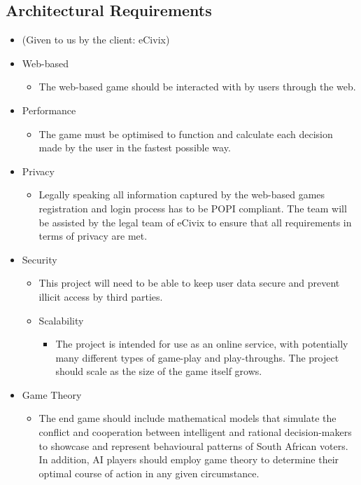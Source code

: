 \documentclass{article}
\begin{document}
   \subsection{Architectural Requirements}
   \begin{itemize}
   \item (Given to us by the client: eCivix)
        \item Web-based
		\begin{itemize}
			\item The web-based game should be interacted with by users through the web.
	    \end{itemize}
	    
	    \item Performance
		\begin{itemize}
			\item The game must be optimised to function and calculate each decision made by the user in the fastest possible way.
	    \end{itemize}
	    
	    \item Privacy 
		\begin{itemize}
			\item Legally speaking all information captured by the web-based games registration and login process has to be POPI compliant. The team will be assisted by the legal team of eCivix to ensure that all requirements in terms of privacy are met. 
	    \end{itemize}
	    
	    \item Security
		\begin{itemize}
			\item This project will need to be able to keep user data secure and prevent illicit access by third parties. 
            
		\item Scalability 
            		\begin{itemize}
				\item The project is intended for use as an online service, with potentially many different types of game-play and play-throughs. The project should scale as the size of the game itself grows. 
			\end{itemize}

	    \end{itemize}
	    
	    
	    \item Game Theory 
		\begin{itemize}
			\item The end game should include mathematical models that simulate the conflict and cooperation between intelligent and rational decision-makers to showcase and represent behavioural patterns of South African voters. In addition, AI players should employ game theory to determine their optimal course of action in any given circumstance.
	    \end{itemize}
   
   \end{itemize}
\end{document}
